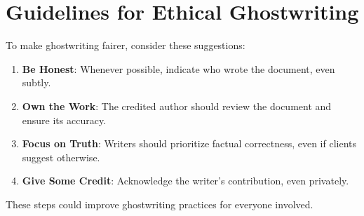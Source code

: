 \documentclass[a4paper,10pt,twocolumn]{memoir}
\begin{document}
\section*{Guidelines for Ethical Ghostwriting}
To make ghostwriting fairer, consider these suggestions:
\begin{enumerate}
    \item \textbf{Be Honest}: Whenever possible, indicate who wrote the document, even subtly.
    \item \textbf{Own the Work}: The credited author should review the document and ensure its accuracy.
    \item \textbf{Focus on Truth}: Writers should prioritize factual correctness, even if clients suggest otherwise.
    \item \textbf{Give Some Credit}: Acknowledge the writer’s contribution, even privately.
\end{enumerate}
These steps could improve ghostwriting practices for everyone involved.

\end{document}
